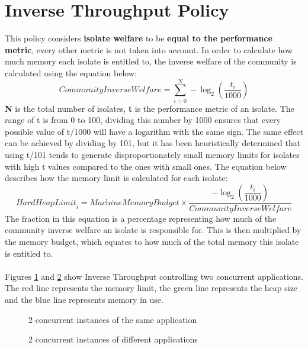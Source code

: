 \documentclass{l4proj}
\begin{document}
\section{Inverse Throughput Policy}
\hspace*{1em} This policy considers \textbf{isolate welfare} to be \textbf{equal to the performance metric}, every other metric is not taken into account. In order to calculate how much memory each isolate is entitled to, the inverse welfare of the community is calculated using the equation below:  
\begin{equation}
\textit{CommunityInverseWelfare} = \sum_{i=0}^{N} -\log_2\left(\dfrac{t_i}{1000}\right)
\end{equation}
\textbf{N} is the total number of isolates, \textbf{t} is the performance metric of an isolate. The range of t is from 0 to 100, dividing this number by 1000 ensures that every possible value of t/1000 will have a logarithm with the same sign. The same effect can be achieved by dividing by 101, but it has been heuristically determined that using t/101 tends to generate disproportionately small memory limits for isolates with high t values compared to the ones with small ones. The equation below describes how the memory limit is calculated for each isolate:
\begin{equation}
\textit{HardHeapLimit}_i = \textit{MachineMemoryBudget} \times \dfrac{-\log_2\left(\dfrac{t_i}{1000}\right)}{\textit{CommunityInverseWelfare}}
\end{equation}
\hspace*{1em} The fraction in this equation is a percentage representing how much of the community inverse welfare an isolate is responsible for. This is then multiplied by the memory budget, which equates to how much of the total memory this isolate is entitled to.
\\\\
\hspace*{1em} Figures \ref{invtp_eq} and \ref{invtp_df} show Inverse Throughput controlling two concurrent applications. The red line represents the memory limit, the green line represents the heap size and the blue line represents memory in use.
\begin{figure}[!ht]
\caption{2 concurrent instances of the same application}
\label{invtp_eq}
\end{figure}
\begin{figure}[!ht]
\caption{2 concurrent instances of different applications}
\label{invtp_df}
\end{figure}
\end{document}
